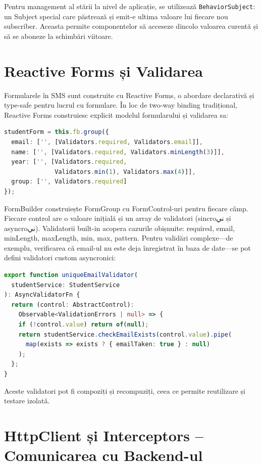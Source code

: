 Pentru management al stării la nivel de aplicație, se utilizează \texttt{BehaviorSubject}: un Subject special care păstrează și emit-e ultima valoare lui fiecare nou subscriber. Aceasta permite componentelor să acceseze dincolo valoarea curentă și să se aboneze la schimbări viitoare.

\section{Reactive Forms și Validarea}

Formularele în SMS sunt construite cu Reactive Forms, o abordare declarativă și type-safe pentru lucrul cu formulare. În loc de two-way binding tradițional, Reactive Forms construiesc explicit modelul formularului și validarea sa:

\begin{lstlisting}[language=TypeScript]
studentForm = this.fb.group({
  email: ['', [Validators.required, Validators.email]],
  name: ['', [Validators.required, Validators.minLength(3)]],
  year: ['', [Validators.required,
              Validators.min(1), Validators.max(4)]],
  group: ['', Validators.required]
});
\end{lstlisting}

FormBuilder construiește FormGroup cu FormControl-uri pentru fiecare câmp. Fiecare control are o valoare inițială și un array de validatori (sincroني și asyncroني). Validatorii built-in acopera cazurile obișnuite: required, email, minLength, maxLength, min, max, pattern. Pentru validări complexe—de exemplu, verificarea că email-ul nu este deja înregistrat în baza de date—se pot defini validatori custom asyncronici:

\begin{lstlisting}[language=TypeScript]
export function uniqueEmailValidator(
  studentService: StudentService
): AsyncValidatorFn {
  return (control: AbstractControl):
    Observable<ValidationErrors | null> => {
    if (!control.value) return of(null);
    return studentService.checkEmailExists(control.value).pipe(
      map(exists => exists ? { emailTaken: true } : null)
    );
  };
}
\end{lstlisting}

Aceste validatori pot fi compoziți și recompuziți, ceea ce permite reutilizare și testare izolată.

\section{HttpClient și Interceptors – Comunicarea cu Backend-ul}

